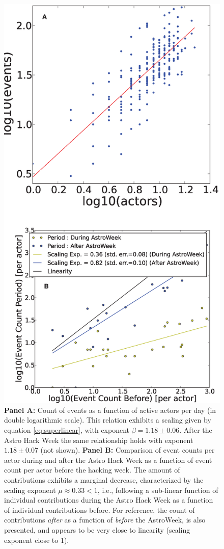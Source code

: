 \begin{figure}[!t]
\centering
\includegraphics[width=0.9\columnwidth]{figures/tradeoff_senior_contributors.eps}
\caption{{\bf Panel A: } Count of events as a function of active actors per day (in double logarithmic scale). This relation exhibits a scaling given by equation \ref{eq:superlinear}, with exponent $\beta = 1.18 \pm 0.06$. After the Astro Hack Week the same relationship holds with exponent $1.18 \pm 0.07$ (not shown). {\bf Panel B: } Comparison of event counts per actor during and after the Astro Hack Week as a function of event count per actor before the hacking week. The amount of contributions exhibits a marginal decrease, characterized by the scaling exponent $\mu \approx 0.33 < 1$, i.e., following a sub-linear function of individual contributions during the Astro Hack Week as a function of individual contributions before. For reference, the count of contributions {\it after}  as a function of {\it before} the AstroWeek, is also presented, and appears to be very close to linearity (scaling exponent close to 1).}
\label{fig:tradeoff}
\end{figure}

